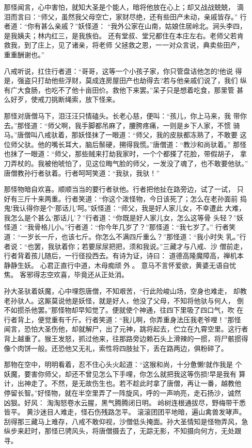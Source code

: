 那怪闻言，心中害怕，就知大圣是个能人，暗将他放在心上；却又战战兢兢，
滴泪而言曰：“师父，虽然我父母空亡，家财尽绝，还有些田产未动，亲戚皆存。”
行者道：“你有甚么亲戚？”妖怪道：
“我外公家在山南，姑娘住居岭北。涧头李四，是我姨夫；林内红三，是我族伯。
还有堂叔、堂兄都住在本庄左右。老师父若肯救我，到了庄上，见了诸亲，将老师
父拯救之恩，一一对众言说，典卖些田产，重重酬谢也。”

八戒听说，扛住行者道：“哥哥，这等一个小孩子家，你只管盘诘他怎的!他说
得是，强盗只打劫他些浮财，莫成连房屋田产也劫得去?若与他亲戚们说了，我们
纵有广大食肠，也吃不了他十亩田价。救他下来罢。”呆子只是想着吃食，那里管
甚么好歹，使戒刀挑断绳索，放下怪来。

那怪对唐僧马下，泪汪汪只情磕头。长老心慈，便叫：“孩儿，你上马来，我
带你去。”那怪道：“师父啊，我手脚都吊麻了，腰胯疼痛，一则是乡下人家，不惯
骑马。”唐僧叫八戒驮着，那妖怪抹了一眼道：“师父，我的皮肤都冻熟了，不敢要
这位师父驮。他的嘴长耳大，脑后鬃硬，搠得我慌。”唐僧道：“教沙和尚驮着。”
那怪也抹了一眼道：“师父，那些贼来打劫我家时，一个个都搽了花脸，带假胡子，
拿刀弄杖的。我被他唬怕了，见这位晦气脸的师父，一发没了魂了，也不敢要他驮。”
唐僧教孙行者驮着。行者呵呵笑道：“我驮，我驮！”

那怪物暗自欢喜。顺顺当当的要行者驮他。行者把他扯在路旁边，试了一试，
只好有三斤十来两重。行者笑道：“你这个泼怪物，今日该死了；怎么在老孙面前
捣鬼!我认得你是个‘那话儿’呵。”妖怪道：“师父，我是好人家儿女，不幸遭此
大难，我怎么是个甚么‘那话儿’？”行者道：“你既是好人家儿女，怎么这等骨
头轻？”妖怪道：“我骨格儿小。”行者道：“你今年几岁了？”那怪道：“我七岁了。”
行者笑道：“一岁长一斤，也该七斤。你怎么不满四斤重么？”那怪道：“我小时失
乳。”行者说：“也罢，我驮着你；若要尿尿把把，须和我说。”三藏才与八戒、沙
僧前走，行者背着孩儿随后，一行径投西去。有诗为证，诗曰：
道德高隆魔障高，禅机本静静生妖。
心君正直行中道，木母痴顽外。
意马不言怀爱欲，黄婆无语自忧焦。
客邪得志空欢喜，毕竟还从正处消。

孙大圣驮着妖魔，心中埋怨唐僧，不知艰苦，“行此险峻山场，空身也难走，
却教老孙驮人。这厮莫说他是妖怪，就是好人，他没了父母，不知将他驮与何人，
倒不如掼杀他罢。”那怪物却早知觉了。便就使个神通，往四下里吸了四口气，吹
在行者背上，便觉重有千斤。行者笑道：“我儿啊，你弄重身法压我老爷哩！”那怪
闻言，恐怕大圣伤他，却就解尸，出了元神，跳将起去，伫立在九霄空里。这行者
背上越重了。猴王发怒，抓过他来，往那路旁边赖石头上滑辣的一掼，将尸骸掼得
像个肉饼一般。还恐他又无礼，索性将四肢扯下，丢在路两边，俱粉碎了。

那物在空中，明明看着，忍不住心头火起道：“这猴和尚，十分惫懒!就作我是
个妖魔，要害你师父，却还不曾见怎么下手哩，你怎么就把我这等伤损!早是我有
算计，出神走了。不然，是无故伤生也。若不趁此时拿了唐僧，再让一番，越教他
停留长智。”好怪物，就在半空里弄了一阵旋风，呼的一声响亮，走石扬沙，诚然
凶狠。好风：
淘淘怒卷水云腥，黑气腾腾闭日明。
岭树连根通拔尽，野梅带干悉皆平。
黄沙迷目人难走，怪石伤残路怎平。
滚滚团团平地暗，遍山禽兽发哮声。
刮得那三藏马上难存，八戒不敢仰视，沙僧低头掩面。孙大圣情知是怪物弄风，急
纵步来赶时，那怪已骋风头，将唐僧摄去了，无踪无影，不知摄向何方，无处跟寻。

